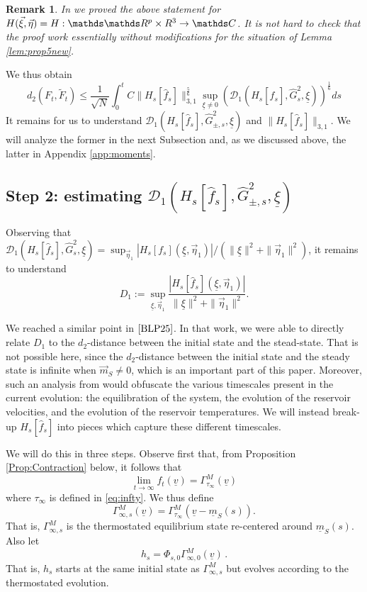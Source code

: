 \documentclass{article}
\newcommand\uv{{\underline v}}
\newcommand\uxi{{\underline \xi}}
\newcommand\veta{{\vec \eta}}
\newtheorem{Remark}{Remark}
\begin{document}
\begin{Remark}
\emph{In \cite[Lemma 3.3]{BLP25} we proved the above statement for $H(\vec\xi, \vec \eta) = H: \mathds \mathds R^p
\times R^3 \to\mathds C$. It is not hard to check that the proof work essentially without modifications for the
situation of Lemma \ref{lem:prop5new}. }
\end{Remark}

We thus obtain
\begin{equation}\label{eq:final}
d_2(F_t, \widetilde F_t) \leq 
\frac 1 {\sqrt N }\int_0^t C\|H_s[\hat{ f}_s]\|_{3,1}^{\frac 56}\sup_{\underline \xi \ne 0} 
\left(
\mathcal D_1(H_s[\hat{ f}_s], \widehat G_{s}^2, \underline \xi)\right)^{\frac 16}ds
\end{equation}
It remains for us to understand $\mathcal D_1(H_s[\hat{f}_s], \widehat G_{\pm,s}^2, \underline \xi)$ and 
$\|H_s[\hat{f}_s]\|_{3,1}$. We will analyze the former in 
the next Subsection and, as we discussed above, %
the latter in Appendix \ref{app:moments}.


\subsection{Step 2: estimating $\mathcal D_1(H_s[\hat{f}_s], \widehat G_{\pm,s}^2, \underline \xi)$}\label{subsec:1part}
 
Observing that $\mathcal D_1(H_s[\hat{f}_s], \widehat G_{s}^2, \underline \xi)=\sup_{\veta_{1}} |H_s[
f_s](\uxi,\veta_{1})|/(\|\uxi\|^2+\|\veta_{1}\|^2)$, it remains to understand
%
\[
D_1:=\sup_{\uxi,\veta_{1}} \frac{|H_s[\hat {f}_s](\uxi,\veta_{1})|}{\|\uxi\|^2+\|\veta_{1}\|^2}.
\]
%

We reached a similar point in $\cite{BLP25}$. In that work, we were able to directly relate $D_1$ to the $d_2$-distance
between the initial state and the stead-state. That is not possible here, since the $d_2$-distance between the initial
state and the steady state is infinite when $\vec m_S \ne 0$, which is an important part of this paper. Moreover, such
an analysis from \cite{BLP25} would obfuscate the various timescales present in the current evolution: the
equilibration of the system, the evolution of the reservoir velocities, and the evolution of the reservoir
temperatures. We will instead break-up $H_s[\hat{f}_s]$ into pieces which capture these different timescales.

We will do this in three steps. Observe first that, from Proposition \ref{Prop:Contraction} below, it follows that
\[
\lim_{t\to\infty}  f_t(\uv) = \Gamma_{\tau_\infty}^M(\uv)
\]
where $\tau_\infty$ is defined in \eqref{eq:infty}.
We thus define
\[
\Gamma^M_{\infty,s}(\uv) = \Gamma_{\tau_\infty}^M(\uv - \underline m_S(s)).
\]
%
That is, $\Gamma^M_{\infty,s}$ is the thermostated equilibrium state re-centered around $\underline m_S(s)$. Also let
\[
h_s=\Phi_{s,0}\Gamma^M_{\infty,0}(\uv)\, .%
\]
That is, $h_s$ starts at the same initial state as $\Gamma^M_{\infty,s}$ but evolves according to the thermostated
evolution.
\end{document}
